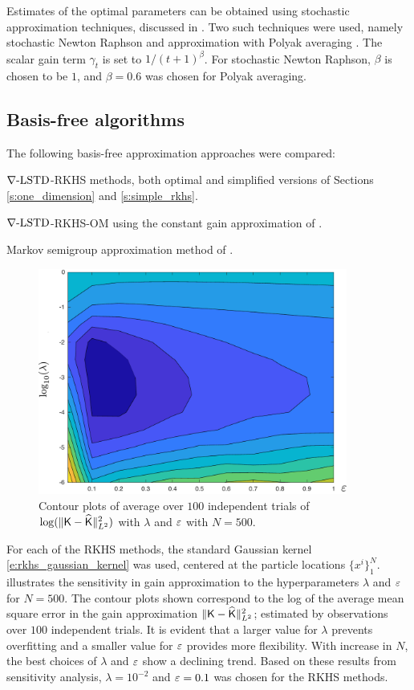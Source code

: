 Estimates of the optimal parameters can be obtained using stochastic approximation techniques, discussed in . Two such techniques were used, namely stochastic Newton Raphson and approximation with Polyak averaging \cite{bor08a}. The scalar gain term $\gamma_t$ is set to $1/(t+1)^{\beta}$. For stochastic Newton Raphson, $\beta$ is chosen to be $1$, and $\beta=0.6$ was chosen for Polyak averaging.

\subsection*{Basis-free algorithms}
The following basis-free approximation approaches were compared:
\begin{romannum}
\item $\nabla\text{-LSTD}$-RKHS methods, both optimal and simplified versions of Sections \ref{s:one_dimension} and \ref{s:simple_rkhs}.
\item $\nabla\text{-LSTD}$-RKHS-OM using the constant gain approximation of .
\item Markov semigroup approximation method of .
\end{romannum}
\begin{figure}[htbp]
	\centering
	\includegraphics[width = 4in]{images/Chap4_log_mse_contour_2m}
	\caption{Contour plots of average over $100$ independent trials of $\log(\|\text{\sf K} - \widehat{\text{\sf K}}\|^2_{L^2})$ with $\lambda$ and $\varepsilon$ with $N=500$.}
	\label{fig:log_mse_contour}
\end{figure}
 For each of the RKHS methods, the standard Gaussian kernel \eqref{e:rkhs_gaussian_kernel} was used, centered at the particle locations $\{x^i\}_1^N$.  illustrates the sensitivity in gain approximation to the hyperparameters $\lambda$ and $\varepsilon$ for $N=500$. The contour plots shown correspond to the log of the average mean square error in the gain approximation $\|\text{\sf K} - \widehat{\text{\sf K}} \|^2_{L^2}$; estimated by observations over $100$ independent trials. It is evident that a larger value for $\lambda$ prevents overfitting and a smaller value for $\varepsilon$ provides more flexibility. With increase in $N$, the best choices of $\lambda$ and $\varepsilon$ show a declining trend. Based on these results from sensitivity analysis, $\lambda = 10^{-2}$ and $\varepsilon = 0.1$ was chosen for the RKHS methods.

